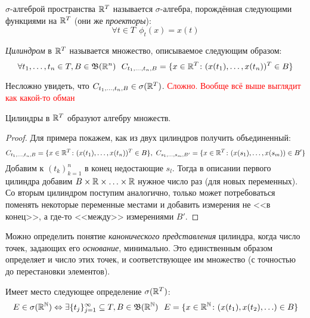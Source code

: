 \begin{definition}
	$\sigma$-алгеброй пространства $\mathbb{R}^T$ называется $\sigma$-алгебра, порождённая следующими функциями на $\mathbb{R}^T$ (они же \textit{проекторы}):
	\[
		\forall t \in T\ \ \phi_t(x) = x(t)
	\]
\end{definition}

\begin{definition}
	\textit{Цилиндром} в $\mathbb{R}^T$ называется множество, описываемое следующим образом:
	\[
		\forall t_1, \ldots, t_n \in T, B \in \B(\R^n)\ \ C_{t_1, \ldots, t_n, B} = \{x \in \R^T \colon (x(t_1), \ldots, x(t_n))^T \in B\}
	\]
\end{definition}

\begin{note}
	Несложно увидеть, что $C_{t_1, \ldots, t_n, B} \in \sigma(\mathbb{R}^T)$. \textcolor{red}{Сложно. Вообще всё выше выглядит как какой-то обман}
\end{note}

\begin{proposition}
	Цилиндры в $\mathbb{R}^T$ образуют алгебру множеств.
\end{proposition}

\begin{proof}
	Для примера покажем, как из двух цилиндров получить объединенный:
	\[
		C_{t_1, \ldots, t_n, B} = \{x \in \mathbb{R}^T \colon (x(t_1), \ldots, x(t_n))^T \in B\},\ C_{s_1, \ldots, s_m, B'} = \{x \in \mathbb{R}^T \colon (x(s_1), \ldots, x(s_m)) \in B'\}
	\]
	Добавим к $(t_k)_{k = 1}^n$ в конец недостающие $s_l$. Тогда в описании первого цилиндра добавим $B \times \mathbb{R} \times \ldots \times \mathbb{R}$ нужное число раз (для новых переменных). Со вторым цилиндром поступим аналогично, только может потребоваться поменять некоторые переменные местами и добавить измерения не <<в конец>>, а где-то <<между>> измерениями $B'$.
\end{proof}

\begin{note}
	Можно определить понятие \textit{канонического представления} цилиндра, когда число точек, задающих его \textit{основание}, минимально. Это единственным образом определяет и число этих точек, и соответствующее им множество (с точностью до перестановки элементов).
\end{note}

\begin{proposition}
	Имеет место следующее определение $\sigma(\mathbb{R}^T)$:
	\[
		E \in \sigma(\mathbb{R}^{\mathbb{N}}) \Leftrightarrow \exists \{t_j\}_{j = 1}^\infty \subseteq T, B \in \mathfrak{B}(\mathbb{R}^{\mathbb{N}})\ \ E = \{x \in \mathbb{R}^{\mathbb{N}} \colon (x(t_1), x(t_2), \ldots) \in B\}
	\]
\end{proposition}

